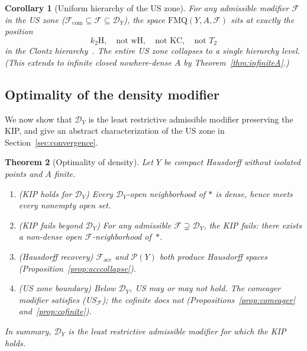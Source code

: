 \documentclass[11pt]{article}
\newtheorem{theorem}{Theorem}[section]
\newtheorem{corollary}[theorem]{Corollary}
\theoremstyle{definition}
\theoremstyle{remark}
\begin{document}
\begin{corollary}[Uniform hierarchy of the US zone]\label{cor:uniformzone}
For any admissible modifier $\mathcal{F}$ in the US zone
($\mathcal{F}_{\mathrm{com}} \subseteq \mathcal{F} \subseteq \mathcal{D}_Y$), the space
$\mathrm{FMQ}(Y, A, \mathcal{F})$ sits at exactly the position
\[
k_2\text{H}, \quad \text{not wH}, \quad \text{not KC}, \quad \text{not } T_2
\]
in the Clontz hierarchy~\cite{bib:clontz}. The entire US zone collapses to a \emph{single} hierarchy level.
\textup{(}This extends to infinite closed nowhere-dense $A$ by
Theorem~\textup{\ref{thm:infiniteA}}.\textup{)}
\end{corollary}

\subsection{Optimality of the density modifier}\label{sec:optimality}

We now show that $\mathcal{D}_Y$ is the least restrictive admissible
modifier preserving the KIP, and give an abstract characterization of
the US zone in Section~\ref{sec:convergence}.

\begin{theorem}[Optimality of density]\label{thm:optimality}
Let $Y$ be compact Hausdorff without isolated points and $A$ finite.
\begin{enumerate}[label=\textup{(\roman*)},nosep]
\item \textup{(KIP holds for $\mathcal{D}_Y$)}\;
  Every $\mathcal{D}_Y$-open neighborhood of $\ast$ is dense, hence meets every nonempty
  open set.
\item \textup{(KIP fails beyond $\mathcal{D}_Y$)}\;
  For any admissible $\mathcal{F} \supsetneq \mathcal{D}_Y$, the KIP fails: there exists a
  non-dense open $\mathcal{F}$-neighborhood of~$\ast$.
\item \textup{(Hausdorff recovery)}\;
  $\mathcal{F}_{\mathrm{acc}}$ and $\mathcal{P}(Y)$ both produce Hausdorff spaces
  (Proposition~\ref{prop:acccollapse}).
\item \textup{(US zone boundary)}\;
  Below $\mathcal{D}_Y$, US may or may not hold. The comeager modifier satisfies
  (US$_{\mathcal{F}}$); the cofinite does not
  (Propositions~\ref{prop:comeager} and~\ref{prop:cofinite}).
\end{enumerate}
In summary, $\mathcal{D}_Y$ is the least restrictive admissible modifier for which the KIP
holds.
\end{theorem}
\end{document}
